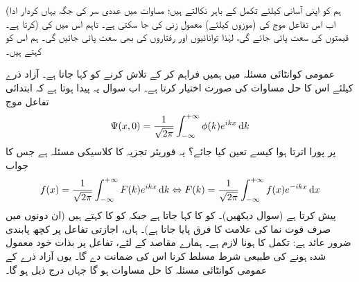 (ہم  کو اپنی آسانی کیلئے تکمل کے باہر نکالتے ہیں؛ مساوات 
  میں عددی سر  کی جگہ یہاں  کردار ادا کرتا ہے۔) اب اس تفاعل موج کی (موزوں  کیلئے) معمول زنی کی جا  سکتی   ہے۔ تاہم اس میں  کی قیمتوں کی سعت پائی جائے گی، لہٰذا توانائیوں اور رفتاروں کی بھی سعت پائی جائیں گی۔ ہم اس کو  کہتے ہیں۔

عمومی کوانٹائی مسئلہ میں ہمیں  فراہم کر کے  تلاش کرنے کو کہا جاتا ہے۔ آزاد ذرے کیلئے اس کا حل مساوات  کی صورت اختیار کرتا ہے۔ اب سوال یہ پیدا ہوتا ہے کہ ابتدائی تفاعل موج 
\begin{align}
\Psi (x,0) = \frac{1}{\sqrt{2\pi}} \int_{- \infty}^{+ \infty} \phi (k) e^{ikx} \dif k
\end{align}
پر پورا اترتا ہوا  کیسے تعین کیا جائے؟ یہ فوریئر تجزیہ کا کلاسیکی مسئلہ ہے جس کا جواب 
\begin{align}\label{مساوات_شروڈنگر_مسئلہ_پلانشرل}
f(x) = \frac{1}{\sqrt{2\pi}} \int_{- \infty}^{+ \infty} F(k) e^{ikx} \dif k \Leftrightarrow F(k) = \frac{1}{\sqrt{2\pi}} \int_{- \infty}^{+ \infty} f(x) e^{-ikx} \dif x
\end{align}
 پیش کرتا ہے (سوال  دیکھیں)۔  کو  کا  کہا جاتا ہے جبکہ  کو  کا  کہتے ہیں (ان دونوں میں صرف قوت نما کی علامت کا فرق پایا جاتا ہے)۔ ہاں، اجازتی تفاعل پر کچھ پابندی ضرور عائد ہے: تکمل کا  ہونا لازم ہے۔ ہمارے مقاصد کے لئے، تفاعل  پر بذات خود معمول شدہ ہونے کی طبیعی شرط مسلط کرنا اس کی ضمانت دے گا۔ یوں آزاد ذرے کے عمومی کوانٹائی مسئلہ کا حل مساوات  ہو گا جہاں  درج ذیل ہو گا۔ 
